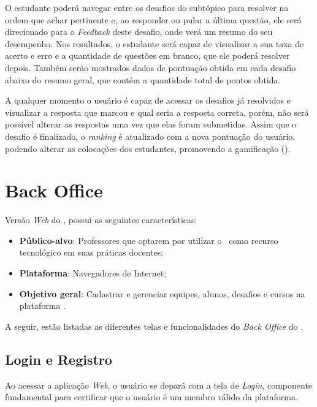 O estudante poderá navegar entre os desafios do subtópico para resolver na ordem que achar pertinente e, ao responder ou pular a última questão, ele será direcionado para o \textit{Feedback} deste desafio, onde verá um resumo do seu desempenho. Nos resultados, o estudante será capaz de visualizar a sua taxa de acerto e erro e a quantidade de questões em branco, que ele poderá resolver depois. Também serão mostrados dados de pontuação obtida em cada desafio abaixo do resumo geral, que contém a quantidade total de pontos obtida.

A qualquer momento o usuário é capaz de acessar os desafios já resolvidos e visualizar a resposta que marcou e qual seria a resposta correta, porém, não será possível alterar as respostas uma vez que elas foram submetidas. Assim que o desafio é finalizado, o \textit{ranking} é atualizado com a nova pontuação do usuário, podendo alterar as colocações dos estudantes, promovendo a gamificação ().

\section{Back Office}
\label{backoffice}

Versão \textit{Web} do \appName, possui as seguintes características:

\begin{itemize}
    \item \textbf{Público-alvo}: Professores que optarem por utilizar o \appName\ como recurso tecnológico em suas práticas docentes;
    \item \textbf{Plataforma}: Navegadores de Internet;
    \item \textbf{Objetivo geral}: Cadastrar e gerenciar equipes, alunos, desafios e cursos na plataforma \appName .
\end{itemize}

A seguir, estão listadas as diferentes telas e funcionalidades do \textit{Back Office} do \appName .

\subsection{Login e Registro}
Ao acessar a aplicação \textit{Web}, o usuário se depará com a tela de \textit{Login}, componente fundamental para certificar que o usuário é um membro válido da plataforma.


